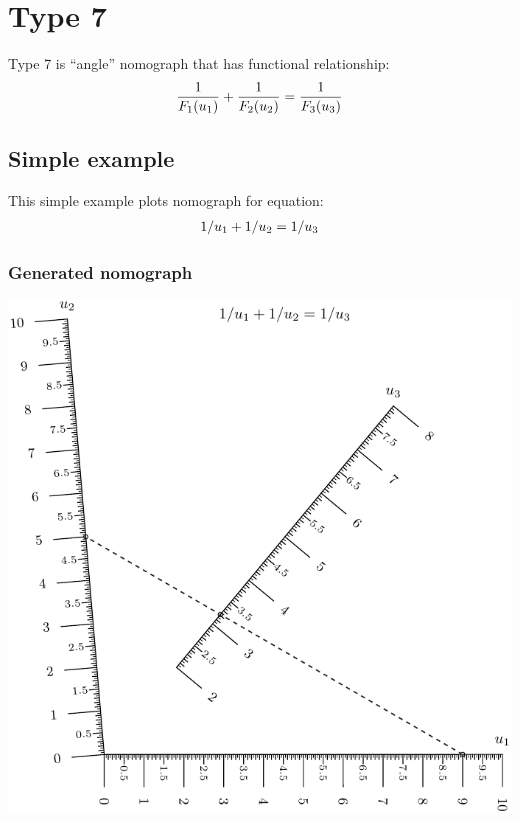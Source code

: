 \documentclass[a4paper,11pt,english]{sphinxmanual}
\begin{document}
\section{Type 7}
\label{types/types:type-7}\label{types/types:type7-ref}
Type 7 is ``angle'' nomograph that has functional relationship:
\begin{gather}
\begin{split}\frac{1}{F_1(u_1)}+\frac{1}{F_2(u_2)}=\frac{1}{F_3(u_3)}\end{split}\notag
\end{gather}

\subsection{Simple example}
\label{types/types:id45}
This simple example plots nomograph for equation:
\begin{gather}
\begin{split}1/ u_1 + 1/u_2 = 1 / u_3\end{split}\notag
\end{gather}

\subsubsection{Generated nomograph}
\label{types/types:id46}
\includegraphics{ex_type7_nomo_1.pdf}
\end{document}
